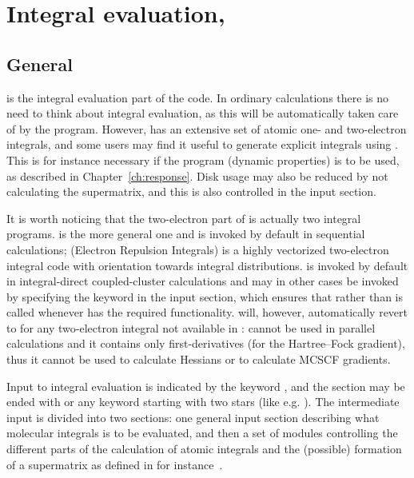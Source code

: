 \chapter{Integral evaluation, {\her}}\label{ch:hermit}

\section{General}\label{sec:herminf}

    {\her} is the integral evaluation part of the code. In ordinary
calculations there is no need to think about integral evaluation, as
this will be automatically taken care of by the program. However,
{\her} has an extensive set of atomic one- and two-electron
integrals,
and some users may find it useful to generate explicit integrals using
{\her}. This is for instance necessary if the {\resp} program (dynamic
properties) is to be
used, as described in Chapter~\ref{ch:response}. Disk usage may also
be reduced by not calculating the
supermatrix, and this is also controlled in the
 input section.

It is worth noticing that the two-electron part of {\her} is actually
two integral programs. {\twoint} is the more general one and is invoked by
default in sequential calculations; {\eri} (Electron Repulsion
Integrals) is a highly vectorized two-electron integral code with
orientation towards integral distributions. {\eri} is
invoked by default in integral-direct coupled-cluster calculations and
may in other cases be invoked by specifying the  keyword
in the  input section, which ensures that {\eri}
rather than {\twoint} is called whenever {\eri} has the required
functionality. {\dalton} will, however, automatically revert to
{\twoint} for any two-electron integral not available in {\eri}:
{{\eri} cannot be used in parallel
calculations and it contains only first-derivatives (for
the Hartree--Fock gradient), thus it cannot be used to calculate
Hessians or to calculate MCSCF gradients.}

    Input to integral evaluation is
indicated by the keyword , and the section may be
ended with  or any keyword starting with two stars
(like e.g. ). The intermediate input is
divided into two sections: one general input section describing
what molecular integrals is to be evaluated, and then a set of
modules controlling the different parts of the calculation of
atomic integrals and the (possible) formation of
a supermatrix as defined in for instance~\cite{pemsjaahborjcp74}.


